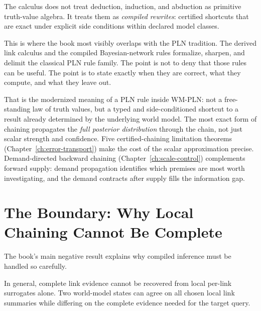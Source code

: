 \documentclass[11pt,openany]{report}
\begin{document}
The calculus does not treat deduction, induction, and abduction as primitive
truth-value algebra.  It treats them as \emph{compiled rewrites}: certified
shortcuts that are exact under explicit side conditions within declared model
classes.

This is where the book most visibly overlaps with the PLN tradition.  The
derived link calculus and the compiled Bayesian-network rules formalize,
sharpen, and delimit the classical PLN rule family.  The point is not to deny
that those rules can be useful.  The point is to state exactly when they are
correct, what they compute, and what they leave out.


That is the modernized meaning of a PLN rule inside WM-PLN:
not a free-standing law of truth values, but a typed and side-conditioned
shortcut to a result already determined by the underlying world model.
The most exact form of chaining propagates the \emph{full posterior
distribution} through the chain, not just scalar strength and
confidence.  Five certified-chaining limitation theorems
(Chapter~\ref{ch:error-transport}) make the cost of the scalar
approximation precise.  Demand-directed backward chaining
(Chapter~\ref{ch:scale-control}) complements forward supply:
demand propagation identifies which premises are most worth
investigating, and the demand contracts after supply fills the
information gap.

\section{The Boundary: Why Local Chaining Cannot Be Complete}
\label{sec:overview-boundary}

The book's main negative result explains why compiled inference must be
handled so carefully.

\begin{theorem}
\label{thm:overview-no-go}
In general, complete link evidence cannot be recovered from local per-link
surrogates alone.  Two world-model states can agree on all chosen local link
summaries while differing on the complete evidence needed for the target
query.
\end{theorem}
\end{document}
